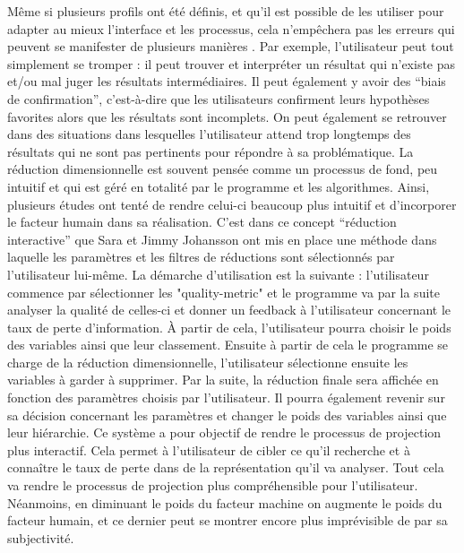 Même si plusieurs profils ont été définis, et qu'il est possible de les utiliser pour adapter au mieux l’interface et les processus, cela n’empêchera pas les erreurs qui peuvent se manifester de plusieurs manières \cite{baron1988heuristics}. Par exemple, l’utilisateur peut tout simplement se tromper : il peut trouver et interpréter un résultat qui n’existe pas et/ou mal juger les résultats intermédiaires. 
Il peut également y avoir des “biais de confirmation”, c'est-à-dire que les utilisateurs confirment leurs hypothèses favorites alors que les résultats sont incomplets\cite{micallef2019HumanProgressiv}. On peut également se retrouver dans des situations dans lesquelles l’utilisateur attend trop longtemps des résultats qui ne sont pas pertinents pour répondre à sa problématique.
\smallskip
La réduction dimensionnelle est souvent pensée comme un processus de fond, peu intuitif et qui est géré en totalité par le programme et les algorithmes.
 Ainsi, plusieurs études ont tenté de rendre celui-ci beaucoup plus intuitif et d'incorporer le facteur humain dans sa réalisation\cite{micallef2019HumanProgressiv}\cite{mahoney1977Biais}. C’est dans ce concept “réduction interactive” que Sara et Jimmy Johansson ont mis en place une méthode dans laquelle les paramètres et les filtres de réductions sont sélectionnés par l’utilisateur lui-même\cite{scarlet}.
La démarche d’utilisation est la suivante : 
l’utilisateur commence par sélectionner les "quality-metric" et le programme va par la suite analyser la qualité de celles-ci et donner un feedback à l’utilisateur concernant le taux de perte d’information. À partir de cela, l’utilisateur pourra choisir le poids des variables ainsi que leur classement. Ensuite à partir de cela le programme se charge de la réduction dimensionnelle, l’utilisateur sélectionne ensuite les variables à garder à supprimer. Par la suite, la réduction finale sera affichée en fonction des paramètres choisis par l'utilisateur. Il pourra également revenir sur sa décision concernant les paramètres et changer le poids des variables ainsi que leur hiérarchie.
Ce système a pour objectif de rendre le processus de projection  plus interactif. Cela permet à l’utilisateur de cibler ce qu’il recherche et à connaître le taux de perte dans de la représentation qu’il va analyser.
Tout cela va rendre le processus de projection plus compréhensible pour l’utilisateur. Néanmoins, en diminuant le poids du facteur machine on augmente le poids du facteur humain, et ce dernier peut se montrer encore plus imprévisible de par sa subjectivité.
\medskip

